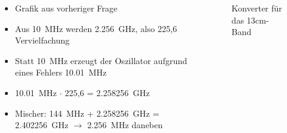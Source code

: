\begin{frame}
\begin{columns}
    \begin{column}{0.48\textwidth}
    \begin{itemize}
  \item Grafik aus vorheriger Frage
  \item Aus \qty{10}{\mega\hertz} werden \qty{2,256}{\giga\hertz}, also 225,6 Vervielfachung
  \item Statt \qty{10}{\mega\hertz} erzeugt der Oszillator aufgrund eines Fehlers \qty{10,01}{\mega\hertz}
  \item \qty{10,01}{\mega\hertz} $\cdot$ 225,6 = \qty{2,258256}{\giga\hertz}
  \item Mischer: \qty{144}{\mega\hertz} + \qty{2,258256}{\giga\hertz} = \qty{2,402256}{\giga\hertz} $\rightarrow$ \qty{2,256}{\mega\hertz} daneben
  \end{itemize}

    \end{column}
   \begin{column}{0.48\textwidth}
       
\begin{figure}
    \caption{\scriptsize Konverter für das 13cm-Band}
    \label{e_konverter_13cm}
\end{figure}


   \end{column}
\end{columns}

\end{frame}%
